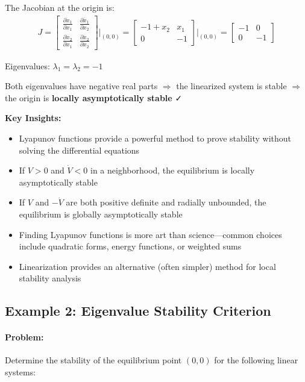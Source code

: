 \documentclass[11pt,a4paper]{article}
\begin{document}
The Jacobian at the origin is:
\begin{align}
  J = \begin{bmatrix} \frac{\partial \dot{x}_1}{\partial x_1} & \frac{\partial \dot{x}_1}{\partial x_2} \\ \frac{\partial \dot{x}_2}{\partial x_1} & \frac{\partial \dot{x}_2}{\partial x_2} \end{bmatrix}\bigg|_{(0,0)} = \begin{bmatrix} -1 + x_2 & x_1 \\ 0 & -1 \end{bmatrix}\bigg|_{(0,0)} = \begin{bmatrix} -1 & 0 \\ 0 & -1 \end{bmatrix}
\end{align}

Eigenvalues: $\lambda_1 = \lambda_2 = -1$

Both eigenvalues have negative real parts $\Rightarrow$ the linearized system is stable $\Rightarrow$ the origin is \textbf{locally asymptotically stable} ✓

\textbf{Key Insights:}
\begin{itemize}
  \item Lyapunov functions provide a powerful method to prove stability without solving the differential equations
  \item If $V > 0$ and $\dot{V} < 0$ in a neighborhood, the equilibrium is locally asymptotically stable
  \item If $V$ and $-\dot{V}$ are both positive definite and radially unbounded, the equilibrium is globally asymptotically stable
  \item Finding Lyapunov functions is more art than science—common choices include quadratic forms, energy functions, or weighted sums
  \item Linearization provides an alternative (often simpler) method for local stability analysis
\end{itemize}

\subsection{Example 2: Eigenvalue Stability Criterion}

\paragraph{Problem:} Determine the stability of the equilibrium point $(0, 0)$ for the following linear systems:
\end{document}
